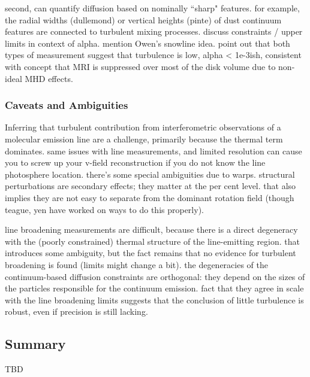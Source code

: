 \documentclass[a4paper]{ar-1col}
\begin{document}
second, can quantify diffusion based on nominally ``sharp" features.  for example, the radial widths (dullemond) or vertical heights (pinte) of dust continuum features are connected to turbulent mixing processes.  discuss constraints / upper limits in context of alpha.  mention Owen's snowline idea.  point out that both types of measurement suggest that turbulence is low, alpha < 1e-3ish, consistent with concept that MRI is suppressed over most of the disk volume due to non-ideal MHD effects.


\subsubsection{Caveats and Ambiguities}
Inferring that turbulent contribution from interferometric observations of a molecular emission line are a challenge, primarily because the thermal term dominates.
same issues with line measurements, and limited resolution can cause you to screw up your v-field reconstruction if you do not know the line photosphere location.  there's some special ambiguities due to warps.  structural perturbations are secondary effects; they matter at the per cent level.  that also implies they are not easy to separate from the dominant rotation field (though teague, yen have worked on ways to do this properly).

line broadening measurements are difficult, because there is a direct degeneracy with the (poorly constrained) thermal structure of the line-emitting region.  that introduces some ambiguity, but the fact remains that no evidence for turbulent broadening is found (limits might change a bit).  the degeneracies of the continuum-based diffusion constraints are orthogonal: they depend on the sizes of the particles responsible for the continuum emission.  fact that they agree in scale with the line broadening limits suggests that the conclusion of little turbulence is robust, even if precision is still lacking.  
 



\begin{textbox}[h]\section{Summary}
TBD  
\end{textbox}
\end{document}
